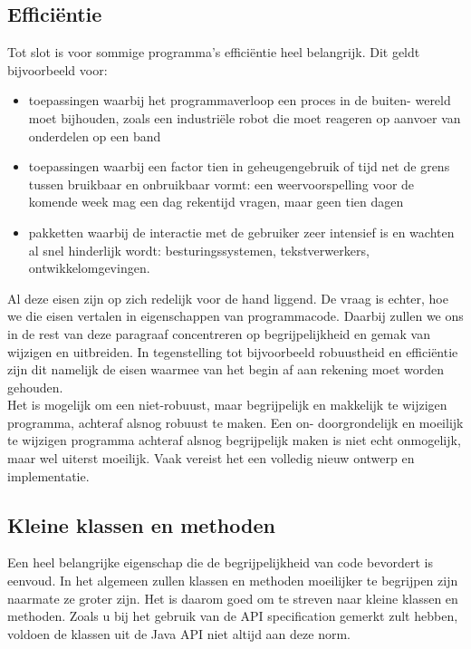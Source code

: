 \documentclass{article}
\begin{document}
	\subsection{Effici\"{e}ntie}
	
	Tot slot is voor sommige programma’s efficiëntie heel belangrijk. Dit geldt
	bijvoorbeeld voor:
	\begin{itemize}
		\item toepassingen waarbij het programmaverloop een proces in de buiten-
		wereld moet bijhouden, zoals een industriële robot die moet reageren op
		aanvoer van onderdelen op een band
		\item toepassingen waarbij een factor tien in geheugengebruik of tijd net de
		grens tussen bruikbaar en onbruikbaar vormt: een weervoorspelling voor
		de komende week mag een dag rekentijd vragen, maar geen tien dagen
		\item pakketten waarbij de interactie met de gebruiker zeer intensief is en
		wachten al snel hinderlijk wordt: besturingssystemen, tekstverwerkers,
		ontwikkelomgevingen.
	\end{itemize}

	Al deze eisen zijn op zich redelijk voor de hand liggend. De vraag is
	echter, hoe we die eisen vertalen in eigenschappen van programmacode.
	Daarbij zullen we ons in de rest van deze paragraaf concentreren op
	begrijpelijkheid en gemak van wijzigen en uitbreiden. In tegenstelling
	tot bijvoorbeeld robuustheid en efficiëntie zijn dit namelijk de eisen
	waarmee van het begin af aan rekening moet worden gehouden. \\
	Het is mogelijk om een niet-robuust, maar begrijpelijk en makkelijk
	te wijzigen programma, achteraf alsnog robuust te maken. Een on-
	doorgrondelijk en moeilijk te wijzigen programma achteraf alsnog
	begrijpelijk maken is niet echt onmogelijk, maar wel uiterst moeilijk.
	Vaak vereist het een volledig nieuw ontwerp en implementatie. \\
	
	\subsection{Kleine klassen en methoden}
	Een heel belangrijke eigenschap die de begrijpelijkheid van code bevordert is eenvoud. In het algemeen zullen klassen en methoden moeilijker te
	begrijpen zijn naarmate ze groter zijn. Het is daarom goed om te streven
	naar kleine klassen en methoden. Zoals u bij het gebruik van de API specification gemerkt zult hebben, voldoen de klassen uit de Java API niet altijd
	aan deze norm. 
\end{document}
